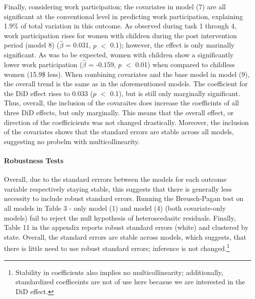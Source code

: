 \documentclass[a4paper]{article}
\begin{document}
\indent Finally, considering work participation; the covariates in model (7) are all significant at the conventional level in predicting work participation, explaining 1.9\% of total variation in this outcome. As observed during task 1 through 4, work participation rises for women with children during the post intervention period (model 8) ($\hat{\beta}$ = 0.031, $p$ $<$ 0.1); however, the effect is only marinally significant. As was to be expected, women with children show a significantly lower work participation ($\hat{\beta}$ = -0.159, $p$ $<$ 0.01) when compared to childless women (15.9\$ less). When combining covariates and the base model in model (9), the overall trend is the same as in the aforementioned models. The coefficient for the DiD effect rises to 0.033 ($p$ $<$ 0.1), but is still only marginally significant.
Thus, overall, the inclusion of the covaraites does increase the coefficints of all three DiD effects, but only marginally. This means that the overall effect, or direction of the coefficicients was not changed drastically. Moreover, the inclusion of the covariates shows that the standard errors are stable across all models, suggesting no probelm with multicollinearity. 
\paragraph{Robustness Tests} Overall, due to the standard errrors between the models for each outcome variable respectively staying stable, this suggests that there is generally less necessity to include robust standard errors. Running the Breusch-Pagan test on all models in Table 3 - only model (1) and model (4) (both covariate-only models) fail to reject the null hypothesis of heteroscedasitc residuals. Finally, Table 11 in the appendix reports robust standard errors (white) and clustered by state. Overall, the standard errors are stable across models, which suggests, that there is little need to use robust standard errors; inference is not changed.\footnote{Stability in coefficients also implies no multicollinearity; additionally, standardized coefficeints are not of use here becasue we are interested in the DiD effect.} 
\end{document}
